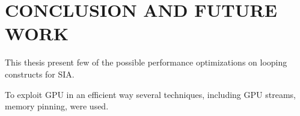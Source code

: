 \chapter{CONCLUSION AND FUTURE WORK} \label{intro}

This thesis present few of the possible performance optimizations on looping
constructs for SIA.

To exploit GPU in an efficient way several techniques, including GPU streams,
memory pinning, were used.